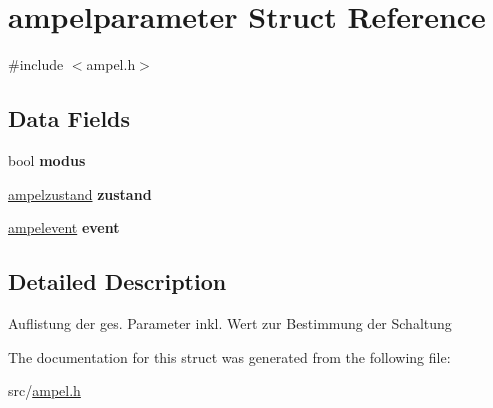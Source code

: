 \hypertarget{structampelparameter}{}\section{ampelparameter Struct Reference}
\label{structampelparameter}


{\ttfamily \#include $<$ampel.\+h$>$}

\subsection*{Data Fields}
\begin{DoxyCompactItemize}
\item 
\hypertarget{structampelparameter_ac2f9c5a8ed7b3978c304740db3db8bc4}{}bool {\bfseries modus}\label{structampelparameter_ac2f9c5a8ed7b3978c304740db3db8bc4}

\item 
\hypertarget{structampelparameter_aa3e849a47e5e680b0f4fe0d2d4727126}{}\hyperlink{ampel_8h_a5f4305c91042b570d5d94e83ce6b8012}{ampelzustand} {\bfseries zustand}\label{structampelparameter_aa3e849a47e5e680b0f4fe0d2d4727126}

\item 
\hypertarget{structampelparameter_ad70553c5639d1dbd1db238ba0ede8fc2}{}\hyperlink{ampel_8h_a81b8396a1636de3e1e604ce4935e2f29}{ampelevent} {\bfseries event}\label{structampelparameter_ad70553c5639d1dbd1db238ba0ede8fc2}

\end{DoxyCompactItemize}


\subsection{Detailed Description}
Auflistung der ges. Parameter inkl. Wert zur Bestimmung der Schaltung 

The documentation for this struct was generated from the following file\+:\begin{DoxyCompactItemize}
\item 
src/\hyperlink{ampel_8h}{ampel.\+h}\end{DoxyCompactItemize}
